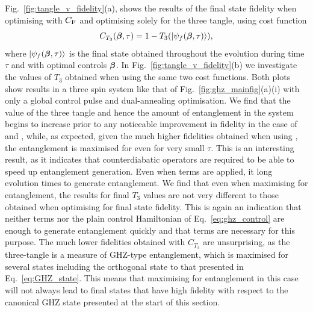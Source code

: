 Fig.~\ref{fig:tangle_v_fidelity}(a), shows the results of the final state fidelity when optimising with $C_{\rm F}$ and optimising solely for the three tangle, using cost function
\begin{equation}\label{eq:tangle_costfunc}
    C_{T_3}(\boldsymbol{\beta}, \tau) = 1 - T_3(\ket{\psi_f(\boldsymbol{\beta}, \tau)}),
\end{equation}
where $\ket{\psi_f(\boldsymbol{\beta}, \tau)}$ is the final state obtained throughout the evolution during time $\tau$ and with optimal controls $\boldsymbol{\beta}$. In Fig.~\ref{fig:tangle_v_fidelity}(b) we investigate the values of $T_3$ obtained when using the same two cost functions. Both plots show results in a three spin system like that of Fig.~\ref{fig:ghz_mainfig}(a)(i) with only a global control pulse and dual-annealing optimisation. We find that the value of the three tangle and hence the amount of entanglement in the system begins to increase prior to any noticeable improvement in fidelity in the case of  and  , while, as expected, given the much higher fidelities obtained when using  , the entanglement is maximised for even for very small $\tau$. This is an interesting result, as it indicates that  counterdiabatic operators are required to be able to speed up entanglement generation. Even when  terms are applied, it long evolution times to generate entanglement. We find that even when maximising for entanglement, the results for final $T_3$ values are not very different to those obtained when optimising for final state fidelity. This is again an indication that neither  terms nor the plain control Hamiltonian of Eq.~\eqref{eq:ghz_control} are enough to generate entanglement quickly and that  terms are necessary for this purpose. The much lower fidelities obtained with $C_{T_3}$ are unsurprising, as the three-tangle is a measure of GHZ-type entanglement, which is maximised for several states including the orthogonal state to that presented in Eq.~\eqref{eq:GHZ_state}. This means that maximising for entanglement in this case will not always lead to final states that have high fidelity with respect to the canonical GHZ state presented at the start of this section.